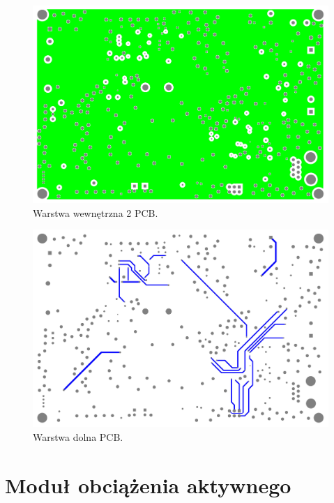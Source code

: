 \begin{figure}
    \begin{center}
        \includegraphics[width = 15cm]{zalaczniki/zasilacz/Zasilacz_regulowany_Strona_11.jpg}
        \caption{Warstwa wewnętrzna 2 PCB.}
    \end{center}
\end{figure}

\begin{figure}
    \begin{center}
        \includegraphics[width = 15cm]{zalaczniki/zasilacz/Zasilacz_regulowany_Strona_12.jpg}
        \caption{Warstwa dolna PCB.}
    \end{center}
\end{figure}


\nopagebreak

\chapter{Moduł obciążenia aktywnego}


